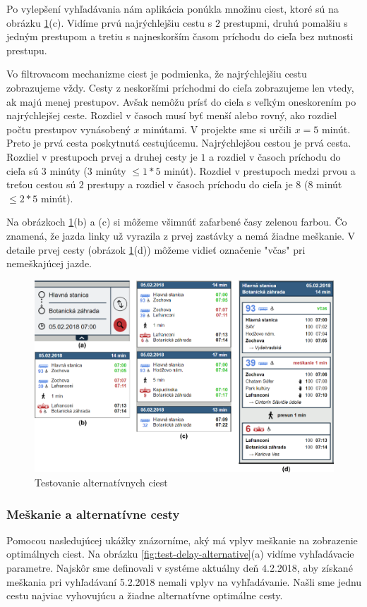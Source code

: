 Po vylepšení vyhľadávania nám aplikácia ponúkla množinu ciest, ktoré sú na obrázku \ref{fig:test-alternative}(c). Vidíme prvú najrýchlejšiu cestu s $2$ prestupmi, druhú pomalšiu s jedným prestupom a tretiu s najneskorším časom príchodu do cieľa bez nutnosti prestupu. 

Vo filtrovacom mechanizme ciest je podmienka, že najrýchlejšiu cestu zobrazujeme vždy. Cesty z neskoršími príchodmi do cieľa zobrazujeme len vtedy, ak majú menej prestupov. Avšak nemôžu prísť do cieľa s veľkým oneskorením po najrýchlejšej ceste. Rozdiel v časoch musí byť menší alebo rovný, ako rozdiel počtu prestupov vynásobený $x$ minútami. V projekte sme si určili $x = 5$ minút. Preto je prvá cesta poskytnutá cestujúcemu. Najrýchlejšou cestou je prvá cesta. Rozdiel v prestupoch prvej a druhej cesty je $1$ a rozdiel v časoch príchodu do cieľa sú $3$ minúty ($3$ minúty $\leq 1*5$ minút).
Rozdiel v prestupoch medzi prvou a treťou cestou sú $2$ prestupy a rozdiel v časoch príchodu do cieľa je $8$ ($8$ minút $\leq 2*5$ minút).

Na obrázkoch \ref{fig:test-alternative}(b) a (c) si môžeme všimnúť zafarbené časy zelenou farbou. Čo znamená, že jazda linky už vyrazila z prvej zastávky a nemá žiadne meškanie. V detaile prvej cesty (obrázok \ref{fig:test-alternative}(d)) môžeme vidieť označenie "včas" pri nemeškajúcej jazde.

\begin{figure}[H]
\centerline{\includegraphics[width=1.0\textwidth]{images/test/alternative}}
\caption[Testovanie alternatívnych ciest]{Testovanie alternatívnych ciest}
\label{fig:test-alternative}
\end{figure}

\subsubsection{Meškanie a alternatívne cesty}
Pomocou nasledujúcej ukážky znázorníme, aký má vplyv meškanie na zobrazenie optimálnych ciest. Na obrázku \ref{fig:test-delay-alternative}(a) vidíme vyhľadávacie parametre. Najskôr sme definovali v systéme aktuálny deň 4.2.2018, aby získané meškania pri vyhľadávaní 5.2.2018 nemali vplyv na vyhľadávanie. Našli sme jednu cestu najviac vyhovujúcu a žiadne alternatívne optimálne cesty. 

